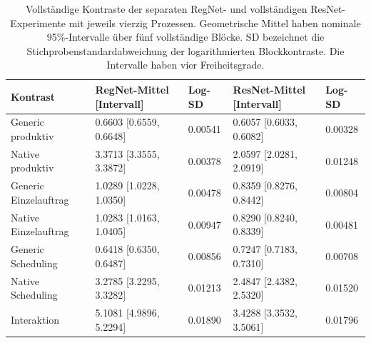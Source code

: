 \begin{table}[t]
\centering
\caption{Vollständige Kontraste der separaten RegNet- und vollständigen ResNet-Experimente mit jeweils vierzig Prozessen. Geometrische Mittel haben nominale 95\%-Intervalle über fünf vollständige Blöcke. SD bezeichnet die Stichprobenstandardabweichung der logarithmierten Blockkontraste. Die Intervalle haben vier Freiheitsgrade.}
\label{tab:supp-scheduling-summary}
\begingroup\small\setlength{\tabcolsep}{3pt}
\begin{tabular}{lllll}
\toprule
Kontrast & RegNet-Mittel [Intervall] & Log-SD & ResNet-Mittel [Intervall] & Log-SD \\
\midrule
Generic produktiv & 0.6603 [0.6559, 0.6648] & 0.00541 & 0.6057 [0.6033, 0.6082] & 0.00328 \\
Native produktiv & 3.3713 [3.3555, 3.3872] & 0.00378 & 2.0597 [2.0281, 2.0919] & 0.01248 \\
Generic Einzelauftrag & 1.0289 [1.0228, 1.0350] & 0.00478 & 0.8359 [0.8276, 0.8442] & 0.00804 \\
Native Einzelauftrag & 1.0283 [1.0163, 1.0405] & 0.00947 & 0.8290 [0.8240, 0.8339] & 0.00481 \\
Generic Scheduling & 0.6418 [0.6350, 0.6487] & 0.00856 & 0.7247 [0.7183, 0.7310] & 0.00708 \\
Native Scheduling & 3.2785 [3.2295, 3.3282] & 0.01213 & 2.4847 [2.4382, 2.5320] & 0.01520 \\
Interaktion & 5.1081 [4.9896, 5.2294] & 0.01890 & 3.4288 [3.3532, 3.5061] & 0.01796 \\
\bottomrule
\end{tabular}
\endgroup
\end{table}
